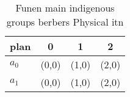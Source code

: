 \documentclass[a4paper]{article}
\begin{document}
\begin{table}
\begin{adjustbox}{width=0.5\columnwidth}
\begin{tabular}{|l|l|l|l|}
\hline
\textbf{plan} & \multicolumn{1}{c|}{\textbf{0}} & \multicolumn{1}{c|}{\textbf{1}} & \multicolumn{1}{c|}{\textbf{2}} \\ \hline
\textbf{$a_0$}  & (0,0) & (1,0) & (2,0) \\ \hline
\textbf{$a_1$}  & (0,0) & (1,0) & (2,0) \\ \hline
\end{tabular}
\end{adjustbox}
\caption{Funen main indigenous groups berbers Physical itn
}
\end{table}
\end{document}
